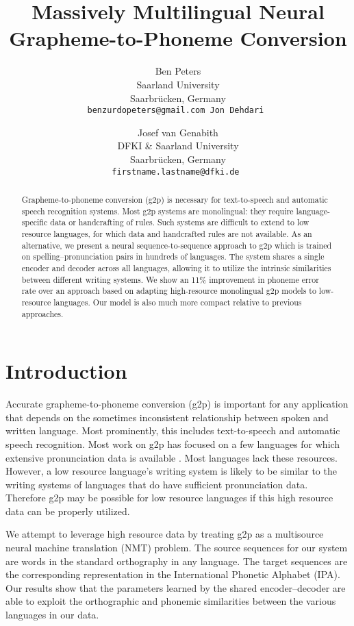 \documentclass[11pt,letterpaper]{article}
\title{Massively Multilingual Neural Grapheme-to-Phoneme Conversion}
\author{Ben Peters \\ Saarland University \\ Saarbr\"ucken, Germany \\ \tt{benzurdopeters@gmail.com}
		\And Jon Dehdari \and Josef van Genabith \\ DFKI \& Saarland University \\ Saarbr\"ucken, Germany \\ \tt{firstname.lastname@dfki.de}
        }
\date{}
\begin{document}
\maketitle

\begin{abstract}
Grapheme-to-phoneme conversion (g2p) is necessary for text-to-speech and automatic speech recognition systems. Most g2p systems are monolingual: they require language-specific data or handcrafting of rules. Such systems are difficult to extend to low resource languages, for which data and handcrafted rules are not available. As an alternative, we present a neural sequence-to-sequence approach to g2p which is trained on spelling--pronunciation pairs in hundreds of languages. The system shares a single encoder and decoder across all languages, allowing it to utilize the intrinsic similarities between different writing systems. We show an 11\% improvement in phoneme error rate over an approach based on adapting high-resource monolingual g2p models to low-resource languages. Our model is also much more compact relative to previous approaches.
\end{abstract}

\section{Introduction}
Accurate grapheme-to-phoneme conversion (g2p) is important for any application that depends on the sometimes inconsistent relationship between spoken and written language. Most prominently, this includes text-to-speech and automatic speech recognition. Most work on g2p has focused on a few languages for which extensive pronunciation data is available \citep[\it inter alia]{bisani2008joint,novak2016phonetisaurus,rao2015grapheme,DBLP:journals/corr/YaoZ15}. Most languages lack these resources. However, a low resource language's writing system is likely to be similar to the writing systems of languages that do have sufficient pronunciation data. Therefore g2p may be possible for low resource languages if this high resource data can be properly utilized. 

We attempt to leverage high resource data by treating g2p as a multisource neural machine translation (NMT) problem. The source sequences for our system are words in the standard orthography in any language. The target sequences are the corresponding representation in the International Phonetic Alphabet (IPA). Our results show that the parameters learned by the shared encoder--decoder are able to exploit the orthographic and phonemic similarities between the various languages in our data.
\end{document}
